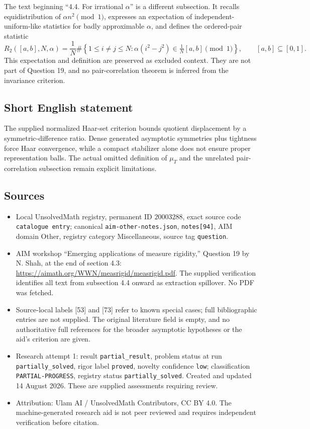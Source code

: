 \documentclass[11pt]{article}
\begin{document}
The text beginning ``4.4. For irrational \(\alpha\)'' is a different subsection. It recalls equidistribution of \(\alpha n^2\pmod1\), expresses an expectation of independent-uniform-like statistics for badly approximable \(\alpha\), and defines the ordered-pair statistic
\[
 R_2([a,b],N,\alpha)=\frac1N\#\left\{1\leq i\ne j\leq N:
 \alpha(i^2-j^2)\in\tfrac1N[a,b]\pmod1\right\},\qquad[a,b]\subseteq[0,1].
\]
This expectation and definition are preserved as excluded context. They are not part of Question 19, and no pair-correlation theorem is inferred from the invariance criterion.
\subsection{Short English statement}
The supplied normalized Haar-set criterion bounds quotient displacement by a symmetric-difference ratio. Dense generated asymptotic symmetries plus tightness force Haar convergence, while a compact stabilizer alone does not ensure proper representation balls. The actual omitted definition of \(\mu_T\) and the unrelated pair-correlation subsection remain explicit limitations.
\subsection{Sources}
\begin{itemize}
\item Local UnsolvedMath registry, permanent ID \(20003288\), exact source code \texttt{catalogue entry}; canonical \texttt{aim-other-notes.json}, \texttt{notes[94]}, AIM domain Other, registry category Miscellaneous, source tag \texttt{question}.
\item AIM workshop ``Emerging applications of measure rigidity,'' Question 19 by N. Shah, at the end of section 4.3: \url{https://aimath.org/WWN/measrigid/measrigid.pdf}. The supplied verification identifies all text from subsection 4.4 onward as extraction spillover. No PDF was fetched.
\item Source-local labels [53] and [73] refer to known special cases; full bibliographic entries are not supplied. The original literature field is empty, and no authoritative full references for the broader asymptotic hypotheses or the aid's criterion are given.
\item Research attempt 1: result \texttt{partial\_result}, problem status at run \texttt{partially\_solved}, rigor label \texttt{proved}, novelty confidence \texttt{low}; classification \texttt{PARTIAL-PROGRESS}, registry status \texttt{partially\_solved}. Created and updated 14 August 2026. These are supplied assessments requiring review.
\item Attribution: Ulam AI / UnsolvedMath Contributors, CC BY 4.0. The machine-generated research aid is not peer reviewed and requires independent verification before citation.
\end{itemize}
\end{document}
